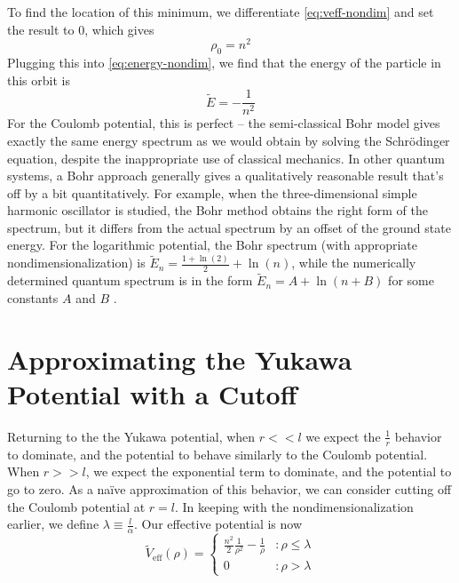 \documentclass[12pt,twoside]{reedthesis}
\newcommand{\eqn}[1]{\begin{equation}#1\end{equation}}
\begin{document}
To find the location of this minimum, we differentiate \eqref{eq:veff-nondim} and set the result to $0$, which gives
\eqn{
\rho_0 = n^2
\label{eq:rho-n}
}
Plugging this into \eqref{eq:energy-nondim}, we find that the energy of the particle in this orbit is
\eqn{
\tilde{E} = -\frac{1}{n^2}
}
For the Coulomb potential, this is perfect -- the semi-classical Bohr model gives exactly the same energy spectrum as we would obtain by solving the Schr\"odinger equation, despite the inappropriate use of classical mechanics. In other quantum systems, a Bohr approach generally gives a qualitatively reasonable result that's off by a bit quantitatively. For example, when the three-dimensional simple harmonic oscillator is studied, the Bohr method obtains the right form of the spectrum, but it differs from the actual spectrum by an offset of the ground state energy. For the logarithmic potential, the Bohr spectrum (with appropriate nondimensionalization) is $\tilde{E}_n = \frac{1 + \ln(2)}{2}+\ln(n)$, while the numerically determined quantum spectrum is in the form $\tilde{E}_n = A + \ln(n+B)$ for some constants $A$ and $B$ \cite{Garon}.

\section{Approximating the Yukawa Potential with a Cutoff}

Returning to the the Yukawa potential, when $r << l$ we expect the $\frac{1}{r}$ behavior to dominate, and the potential to behave similarly to the Coulomb potential. When $r >> l$, we expect the exponential term to dominate, and the potential to go to zero. As a na\"ive approximation of this behavior, we can consider cutting off the Coulomb potential at $r = l$. In keeping with the nondimensionalization earlier, we define $\lambda \equiv \frac{l}{\alpha}$. Our effective potential is now
\eqn{
\tilde{V}_{\mathrm{eff}}(\rho) = \left\{
\begin{array}{lr}
 \frac{n^2}{2}\frac{1}{\rho^2}-\frac{1}{\rho} & : \rho \leq \lambda \\
0 & : \rho > \lambda
\end{array}
\right.
\label{eq:naive}
}
\end{document}
